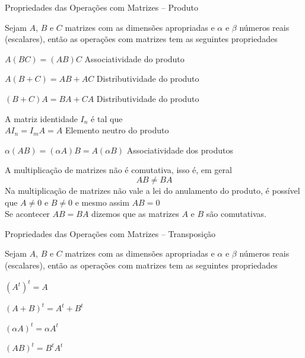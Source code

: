 \begin{teoria}{Propriedades das Operações com Matrizes -- Produto}
    
    Sejam $A$, $B$ e $C$ matrizes com as dimensões apropriadas e $\alpha$ e $\beta$ números reais (escalares), 
    então as operações com matrizes tem as seguintes propriedades
    \begin{propriedades}
        \item $A(BC) = (AB)C$                          \tabto{8cm} Associatividade do produto
        \item $A(B+C) = AB+AC$                         \tabto{8cm} Distributividade do produto
        \item $(B+C)A = BA+CA$                         \tabto{8cm} Distributividade do produto
        \item A matriz identidade $I_n$ é tal que \\
        $AI_n=I_mA=A$                            \tabto{8cm} Elemento neutro do produto
        \item $\alpha(AB) = (\alpha A)B = A(\alpha B)$ \tabto{8cm} Associatividade dos produtos
    \end{propriedades}
    
\end{teoria}

\begin{observacao}
    
    A multiplicação de matrizes não é comutativa, isso é, em geral
    \[ AB \neq BA \]
    Na multiplicação de matrizes não vale a lei do anulamento do produto, é possível que $A\neq0$ e $B\neq0$ e mesmo assim $AB=0$
    \\
    
    Se acontecer $AB=BA$ dizemos que as matrizes $A$ e $B$ são comutativas.
    
\end{observacao}


\begin{teoria}{Propriedades das Operações com Matrizes -- Transposição}
    
    Sejam $A$, $B$ e $C$ matrizes com as dimensões apropriadas e $\alpha$ e $\beta$ números reais (escalares), 
    então as operações com matrizes tem as seguintes propriedades
    \begin{propriedades}
        \item $(A^t)^t=A$
        \item $(A+B)^t =A^t + B^t$
        \item $(\alpha A)^t = \alpha A^t$
        \item $(AB)^t=B^tA^t$
    \end{propriedades}
    
\end{teoria}

